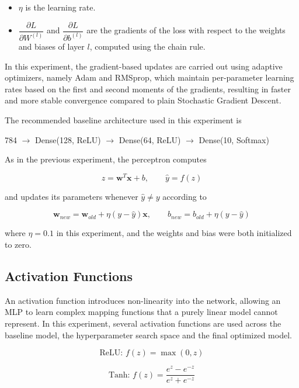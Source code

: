 \documentclass[11pt,a4paper]{article}
\begin{document}
\begin{itemize}
\item $\eta$ is the learning rate.
\item $\dfrac{\partial L}{\partial W^{(l)}}$ and $\dfrac{\partial L}{\partial b^{(l)}}$ are the gradients of the loss with respect to the weights and biases of layer $l$, computed using the chain rule.
\end{itemize}

In this experiment, the gradient-based updates are carried out using adaptive optimizers, namely Adam and RMSprop, which maintain per-parameter learning rates based on the first and second moments of the gradients, resulting in faster and more stable convergence compared to plain Stochastic Gradient Descent.

The recommended baseline architecture used in this experiment is

\begin{center}
784 $\rightarrow$ Dense(128, ReLU) $\rightarrow$ Dense(64, ReLU) $\rightarrow$ Dense(10, Softmax)
\end{center}





As in the previous experiment, the perceptron computes

\[
z=\mathbf{w}^{T}\mathbf{x}+b, \qquad \hat{y}=f(z)
\]

and updates its parameters whenever $\hat{y}\neq y$ according to

\[
\mathbf{w}_{new}=\mathbf{w}_{old}+\eta(y-\hat{y})\mathbf{x}, \qquad b_{new}=b_{old}+\eta(y-\hat{y})
\]

where $\eta = 0.1$ in this experiment, and the weights and bias were both initialized to zero.


\subsection*{Activation Functions}

An activation function introduces non-linearity into the network, allowing an MLP to learn complex mapping functions that a purely linear model cannot represent. In this experiment, several activation functions are used across the baseline model, the hyperparameter search space and the final optimized model.

\[
\text{ReLU: } f(z) = \max(0,z)
\]

\[
\text{Tanh: } f(z) = \frac{e^{z}-e^{-z}}{e^{z}+e^{-z}}
\]
\end{document}
